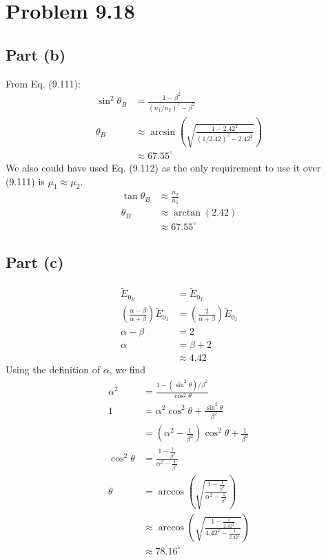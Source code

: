 \documentclass[12pt]{article}
\newcommand{\enterProblemHeader}[1]{
	\rhead{#1}
}
\newenvironment{homeworkProblem}[1]{
    \section{Problem #1}
    \enterProblemHeader{#1}
}{
	\pagebreak
}
\begin{document}
\begin{homeworkProblem}{9.18}
	\subsection{Part (b)}

	From Eq. (9.111):
	\begin{align*}
		\sin^2 \theta_B &= \frac {1 - \beta^2} { (n_1/n_2)^2 - \beta^2
		}\tag{9.111}\\
		\theta_B &\approx \arcsin \left( \sqrt { \frac {1 - 2.42^2} {
		(1/2.42)^2 - 2.42^2 } } \right)\\
		&\approx 67.55^\circ
	\end{align*}
	We also could have used Eq. (9.112) as the only requirement to use it over
	(9.111) is $\mu_1 \approx \mu_2$.
	\begin{align*}
		\tan \theta_B &\approx \frac {n_2} {n_1}\\
		\theta_B &\approx \arctan(2.42)\\
		&\approx 67.55^\circ
	\end{align*}

	\subsection{Part (c)}

	\begin{align*}
		\tilde E_{0_R} &= \tilde E_{0_T}\\
		\left( \frac { \alpha - \beta } { \alpha + \beta } \right) \tilde
		E_{0_I} &= \left( \frac 2 { \alpha + \beta } \right) \tilde E_{0_I}\\
		\alpha - \beta &= 2\\
		\alpha &= \beta + 2\\
		&\approx 4.42
	\end{align*}
	Using the definition of $\alpha$, we find
	\begin{align*}
		\alpha^2 &= \frac {1 - \left( \sin^2 \theta \right) / \beta^2 } { \cos^2
		\theta }\\
		1 &= \alpha^2 \cos^2 \theta + \frac {\sin^2 \theta} {\beta^2}\\
		&= \left( \alpha^2 - \frac 1 {\beta^2} \right) \cos^2 \theta + \frac 1
		{\beta^2}\\
		\cos^2 \theta &= \frac {1 - \frac 1 {\beta^2}} {\alpha^2 - \frac 1
		{\beta^2}}\\
		\theta &= \arccos \left( \sqrt { \frac {1 - \frac 1 {\beta^2}} {\alpha^2
		- \frac 1 {\beta^2}} } \right)\\
		&\approx \arccos \left( \sqrt { \frac {1 - \frac 1 {2.42^2}} {4.42^2 -
		\frac 1 {2.42^2}} } \right)\\
		&\approx 78.16^\circ
	\end{align*}

\end{homeworkProblem}
\end{document}
